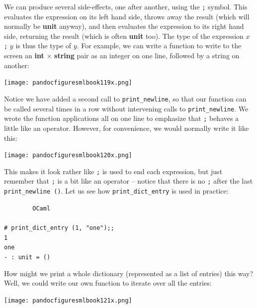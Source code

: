 \documentclass[]{book}
\newcommand{\smspace}{\vspace{4mm}}
\begin{document}
We can produce several side-effects, one after another, using the \texttt{;} symbol. This evaluates the expression on its left hand side, throws away the result (which will normally be \textsf{\textbf{unit}} anyway), and then evaluates the expression to its right hand side, returning the result (which is often \textbf{\textsf{unit}} too). The type of the expression $x$ \texttt{;} $y$ is thus the type of $y$. For example, we can write a function to write to the screen an \textsf{\textbf{int} $\times$ \textbf{string}} pair as an integer on one line, followed by a string on another:

\medskip
\begin{center}
\noindent\texttt{[image: pandocfiguresmlbook119x.png]}
\end{center}
\medskip

\noindent Notice we have added a second call to \texttt{print\_newline}, so that our function can be called several times in a row without intervening calls to \texttt{print\_newline}. We wrote the function applications all on one line to emphasize that \texttt{;} behaves a little like an operator. However, for convenience, we would normally write it like this:

\medskip
\begin{center}
\noindent\texttt{[image: pandocfiguresmlbook120x.png]}
\end{center}
\medskip

\noindent This makes it look rather like \texttt{;} is used to end each expression, but just remember that \texttt{;} is a bit like an operator -- notice that there is no \texttt{;} after the last \texttt{print\_newline ()}. Let us see how \texttt{print\_dict\_entry} is used in practice:

\smspace
\noindent\verb!        OCaml!\\
\noindent\\
\noindent\verb!# print_dict_entry (1, "one");;!\\
\noindent\verb!1!\\
\noindent\verb!one!\\
\noindent\verb!- : unit = ()!
\smspace


\noindent How might we print a whole dictionary (represented as a list of entries) this way? Well, we could write our own function to iterate over all the entries:

\medskip
\begin{center}
\noindent\texttt{[image: pandocfiguresmlbook121x.png]}
\end{center}
\medskip
\end{document}
